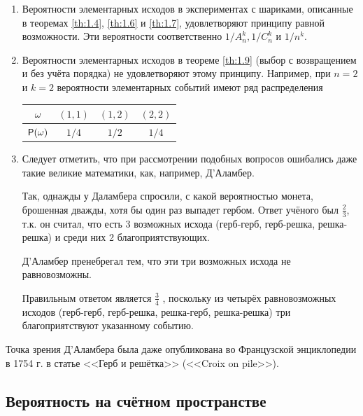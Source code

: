 \begin{zam}\-
	\label{zam:4.11}
\begin{enumerate}[label=\arabic*), listparindent=0pt] 
	\item Вероятности элементарных исходов в экспериментах с шариками, описанные в теоремах \ref{th:1.4}, \ref{th:1.6} и \ref{th:1.7}, удовлетворяют принципу равной возможности. Эти вероятности соответственно $1/A_n^k , 1/C_n^k$ и $1/n^k$.

	\item Вероятности элементарных исходов в теореме \ref{th:1.9} (выбор с возвращением и без учёта порядка) не удовлетворяют этому принципу. Например, при $n = 2$
	и $k = 2$ вероятности элементарных событий имеют ряд распределения

	\begin{center}
		\begin{tabular}{|c|c|c|c|}
			\hline
			$\omega$ & $(1,1)$ & $(1,2)$ & $(2,2)$ \\ \hline
			$\P(\omega)$  & $1/4$ & $1/2$  & $1/4$ \\ \hline
		\end{tabular}
	\end{center}

	\item Следует отметить, что при рассмотрении подобных вопросов ошибались даже такие великие математики, как, например, Д'Аламбер. 

	Так, однажды у Даламбера спросили, с какой вероятностью монета, брошенная дважды, хотя бы один раз выпадет гербом. Ответ учёного был $\frac{2}{3}$, т.к. он считал, что есть 3 возможных исхода (герб-герб, герб-решка, решка-решка) и среди них 2 благоприятствующих. 

	Д'Аламбер пренебрегал тем, что эти три возможных исхода не равновозможны. 

	Правильным ответом является $\frac{3}{4}$ , поскольку из четырёх равновозможных исходов (герб-герб, герб-решка, решка-герб, решка-решка) три благоприятствуют указанному событию.
\end{enumerate}


Точка зрения Д'Аламбера была даже опубликована во Французской энциклопедии в 1754 г. в статье <<Герб и решётка>> (<<Croix on pile>>).
\end{zam}
 

\subsection{Вероятность на счётном пространстве}
\label{par:4.4}

